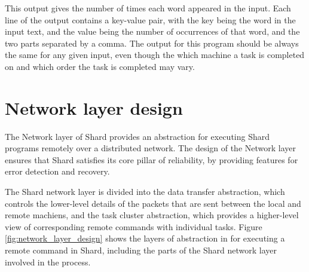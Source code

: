 \documentclass[twoside]{report}
\begin{document}
This output gives the number of times each word appeared in the input.
Each line of the output contains a key-value pair, with the key being the word in the input text, and the value being the number of occurrences of that word, and the two parts separated by a comma.
The output for this program should be always the same for any given input, even though the which machine a task is completed on and which order the task is completed may vary.

\section{Network layer design}


The Network layer of Shard provides an abstraction for executing Shard programs remotely over a distributed network.
The design of the Network layer ensures that Shard satisfies its core pillar of reliability, by providing features for error detection and recovery.

The Shard network layer is divided into the data transfer abstraction, which controls the lower-level details of the packets that are sent between the local and remote machiens, and the task cluster abstraction, which provides a higher-level view of corresponding remote commands with individual tasks.
Figure \ref{fig:network_layer_design} shows the layers of abstraction in for executing a remote command in Shard, including the parts of the Shard network layer involved in the process.
\end{document}
